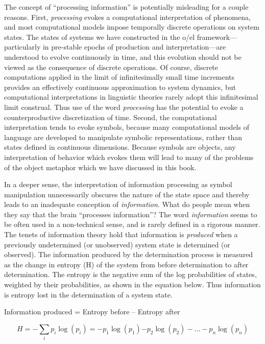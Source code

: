 The concept of “processing information” is potentially misleading for a couple reasons. First, \textit{processing} evokes a computational interpretation of phenomena, and most computational models impose temporally discrete operations on system states. The states of systems we have constructed in the o/el framework—particularly in pre-stable epochs of production and interpretation—are understood to evolve continuously in time, and this evolution should not be viewed as the consequence of discrete operations. Of course, discrete computations applied in the limit of infinitesimally small time increments provides an effectively continuous approximation to system dynamics, but computational interpretations in linguistic theories rarely adopt this infinitesimal limit construal. Thus use of the word \textit{processing} has the potential to evoke a counterproductive discretization of time. Second, the computational interpretation tends to evoke symbols, because many computational models of language are developed to manipulate symbolic representations, rather than states defined in continuous dimensions. Because symbols are objects, any interpretation of behavior which evokes them will lead to many of the problems of the object metaphor which we have discussed in this book. 

In a deeper sense, the interpretation of information processing as symbol manipulation unnecessarily obscures the nature of the state space and thereby leads to an inadequate conception of \textit{information}. What do people mean when they say that the brain “processes information”? The word \textit{information} seems to be often used in a non-technical sense, and is rarely defined in a rigorous manner. The tenets of information theory \citep{Shannon1948} hold that information is \textit{produced} when a previously undetermined (or unobserved) system state is determined (or observed). The information produced by the determination process is measured as the change in entropy (H) of the system from before determination to after determination. The entropy is the negative sum of the log probabilities of states, weighted by their probabilities, as shown in the equation below. Thus information is entropy lost in the determination of a system state.

  Information produced = Entropy before – Entropy after

\begin{equation*}
H=-\sum _{i}{{p}_{i}\log \left({p}_{i}\right)={-p}_{1}\log \left({p}_{1}\right){-p}_{2}\log \left({p}_{2}\right)-{\dots}-{p}_{n}\log \text{⁡}\left({p}_{n}\right)}
\end{equation*}

